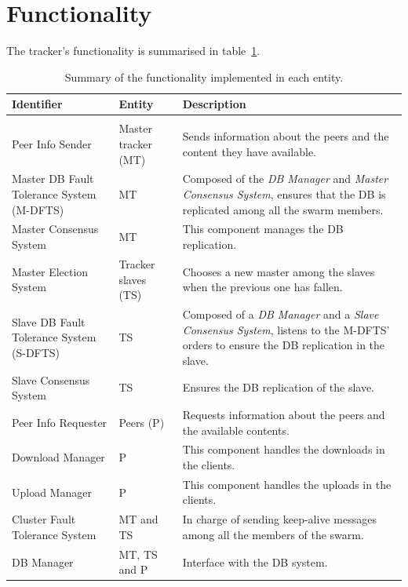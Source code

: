 \documentclass[twoside,a4paper,10pt]{article}
\begin{document}
\section{Functionality}

The tracker's functionality is summarised in table~\ref{tab:fun-entities}.

\begin{table}
  \centering
  \begin{tabularx}{\linewidth}{l l X}
    Identifier & Entity & Description \\ \hline\hline \\
    Peer Info Sender & Master tracker (MT) & Sends information about the peers and
    the content they have available. \\
    Master DB Fault Tolerance System (M-DFTS) & MT & Composed of the
    \emph{DB Manager} and \emph{Master Consensus System}, ensures that the
    DB is replicated among all the swarm members.\\
    Master Consensus System & MT & This component manages the DB
    replication.\\
    Master Election System & Tracker slaves (TS) & Chooses a new master among the
    slaves when the previous one has fallen.\\
    Slave DB Fault Tolerance System (S-DFTS) & TS & Composed of a
    \emph{DB Manager} and a \emph{Slave Consensus System}, listens to the
    M-DFTS' orders to ensure the DB replication in the slave.\\
    Slave Consensus System & TS &  Ensures the DB replication of
    the slave.\\
    Peer Info Requester & Peers (P) & Requests information about the peers and the
    available contents.\\
    Download Manager & P & This component handles the downloads in the
    clients.\\
    Upload Manager & P & This component handles the uploads in the clients. \\
    Cluster Fault Tolerance System & MT and TS &
    In charge of sending keep-alive messages among all the members of the
    swarm.\\
    DB Manager & MT, TS and P & Interface with the
    DB system.\\
  \end{tabularx}
  \caption{\label{tab:fun-entities}Summary of the functionality
    implemented in each entity.}
\end{table}
\end{document}
